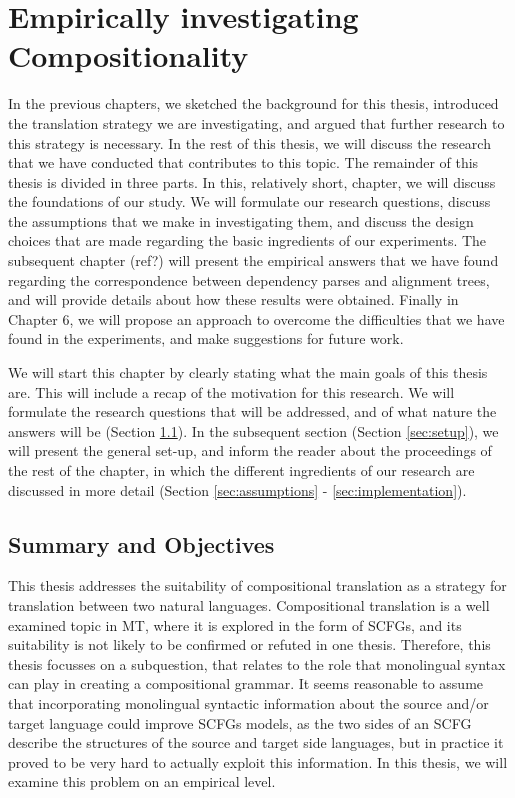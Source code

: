 \documentclass[hidelinks]{report}
\begin{document}
\chapter{Empirically investigating Compositionality}

In the previous chapters, we sketched the background for this thesis, introduced the translation strategy we are investigating, and argued that further research to this strategy is necessary. In the rest of this thesis, we will discuss the research that we have conducted that contributes to this topic. The remainder of this thesis is divided in three parts. In this, relatively short, chapter, we will discuss the foundations of our study. We will formulate our research questions, discuss the assumptions that we make in investigating them, and discuss the design choices that are made regarding the basic ingredients of our experiments. The subsequent chapter (ref?) will present the empirical answers that we have found regarding the correspondence between dependency parses and alignment trees, and will provide details about how these results were obtained. Finally in Chapter 6, we will propose an approach to overcome the difficulties that we have found in the experiments, and make suggestions for future work.

We will start this chapter by clearly stating what the main goals of this thesis are. This will include a recap of the motivation for this research. We will formulate the research questions that will be addressed, and of what nature the answers will be (Section \ref{sec:goals}). In the subsequent section (Section \ref{sec:setup}), we will present the general set-up, and inform the reader about the proceedings of the rest of the chapter, in which the different ingredients of our research are discussed in more detail (Section \ref{sec:assumptions} - \ref{sec:implementation}).


\section{Summary and Objectives}
\label{sec:goals}

This thesis addresses the suitability of compositional translation as a strategy for translation between two natural languages. Compositional translation is a well examined topic in MT, where it is explored in the form of SCFGs, and its suitability is not likely to be confirmed or refuted in one thesis. Therefore, this thesis focusses on a subquestion, that relates to the role that monolingual syntax can play in creating a compositional grammar. It seems reasonable to assume that incorporating monolingual syntactic information about the source and/or target language could improve SCFGs models, as the two sides of an SCFG describe the structures of the source and target side languages, but in practice it proved to be very hard to actually exploit this information. In this thesis, we will examine this problem on an empirical level.
\end{document}
